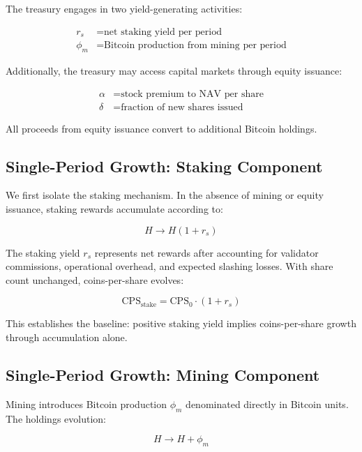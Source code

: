 \documentclass[
  journal=medium,
  manuscript=article-type,
  year=2025,
  volume=1,
]{cup-journal}
\theoremstyle{definition}
\begin{document}
The treasury engages in two yield-generating activities:

\begin{align}
r_s &= \text{net staking yield per period} \\
\phi_m &= \text{Bitcoin production from mining per period}
\end{align}

Additionally, the treasury may access capital markets through equity issuance:

\begin{align}
\alpha &= \text{stock premium to NAV per share} \\
\delta &= \text{fraction of new shares issued}
\end{align}

All proceeds from equity issuance convert to additional Bitcoin holdings.

\subsection{Single-Period Growth: Staking Component}

We first isolate the staking mechanism. In the absence of mining or equity issuance, staking rewards accumulate according to:

\begin{equation}
H \to H(1 + r_s)
\end{equation}

The staking yield $r_s$ represents net rewards after accounting for validator commissions, operational overhead, and expected slashing losses. With share count unchanged, coins-per-share evolves:

\begin{equation}
\text{CPS}_{\text{stake}} = \text{CPS}_0 \cdot (1 + r_s)
\end{equation}

This establishes the baseline: positive staking yield implies coins-per-share growth through accumulation alone.

\subsection{Single-Period Growth: Mining Component}

Mining introduces Bitcoin production $\phi_m$ denominated directly in Bitcoin units. The holdings evolution:

\begin{equation}
H \to H + \phi_m
\end{equation}
\end{document}
